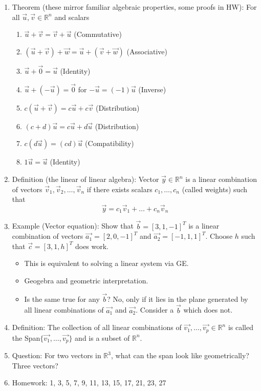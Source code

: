 \documentclass{article}
\begin{document}
\begin{enumerate}
\item Theorem (these mirror familiar algebraic properties, some proofs in HW): For all $\vec{u}, \vec{v} \in \mathbb{R}^n$ and scalars
\begin{enumerate}
\item $\vec{u}+\vec{v} = \vec{v}+\vec{u}$ (Commutative)
\item $(\vec{u}+\vec{v})+\vec{w} = \vec{u}+(\vec{v}+\vec{w})$ (Associative)
\item $\vec{u}+\vec{0}=\vec{u}$ (Identity)
\item $\vec{u} + (-\vec{u}) = \vec{0}$ for $-\vec{u} = (-1)\vec{u}$ (Inverse)
\item $c(\vec{u}+\vec{v}) = c\vec{u}+c\vec{v}$ (Distribution)
\item $(c+d)\vec{u} = c\vec{u}+d\vec{u}$ (Distribution)
\item $c(d\vec{u}) = (cd)\vec{u}$ (Compatibility)
\item $1\vec{u} = \vec{u}$ (Identity)	
\end{enumerate}

\item Definition (the linear of linear algebra): Vector $\vec{y} \in \mathbb{R}^n$ is a linear combination of vectors $\vec{v}_1, \vec{v}_2, \dots, \vec{v}_n$ if there exists scalars $c_1, \dots , c_n$ (called weights) such that 
\[
\vec{y} = c_1 \vec{v}_1 + \dots + c_n\vec{v}_n
\]

\item Example (Vector equation): Show that $\vec{b} = [3,1,-1]^T$ is a linear combination of vectors $\vec{a_1}=[2,0,-1]^T$ and $\vec{a_2} = [-1,1,1]^T$. Choose $h$ such that $\vec{c} = [3,1,h]^T$ does work.
\begin{itemize}
\item This is equivalent to solving a linear system via GE.
\item Geogebra and geometric interpretation.
\item Is the same true for any $\vec{b}$? No, only if it lies in the plane generated by all linear combinations of $\vec{a_1}$ and $\vec{a_2}$. Consider a $\vec{b}$ which does not. 
\end{itemize}


\item Definition: The collection of all linear combinations of $\vec{v_1}, \dots, \vec{v_p} \in \mathbb{R}^n$ is called the Span$\{\vec{v_1}, \dots, \vec{v_p} \}$ and is a subset of $\mathbb{R}^n$.

\item Question: For two vectors in $\mathbb{R}^3$, what can the span look like geometrically? Three vectors?

\item Homework: 1, 3, 5, 7, 9, 11, 13, 15, 17, 21, 23, 27

\end{enumerate}
\end{document}
